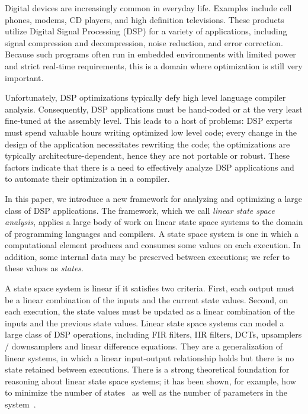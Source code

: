 

    Digital devices are increasingly common in everyday life. Examples
include cell phones, modems, CD players, and high definition
televisions. These products utilize Digital Signal Processing (DSP)
for a variety of applications, including signal compression and
decompression, noise reduction, and error correction.  Because such
programs often run in embedded environments with limited power and
strict real-time requirements, this is a domain where optimization is
still very important.  

Unfortunately, DSP optimizations typically defy high level language
compiler analysis.  Consequently, DSP applications must be hand-coded
or at the very least fine-tuned at the assembly level. This leads to a
host of problems: DSP experts must spend valuable hours writing
optimized low level code; every change in the design of the
application necessitates rewriting the code; the optimizations are
typically architecture-dependent, hence they are not portable or
robust.  These factors indicate that there is a need to effectively
analyze DSP applications and to automate their optimization in a
compiler.

In this paper, we introduce a new framework for analyzing and
optimizing a large class of DSP applications.  The framework, which we
call {\it linear state space analysis}, applies a large body of work
on linear state space systems to the domain of programming languages
and compilers.  A state space system is one in which a computational
element produces and consumes some values on each execution.  In
addition, some internal data may be preserved between executions; we
refer to these values as {\it states}.

A state space system is linear if it satisfies two criteria.  First,
each output must be a linear combination of the inputs and the current
state values.  Second, on each execution, the state values must be
updated as a linear combination of the inputs and the previous state
values.  Linear state space systems can model a large class of DSP
operations, including FIR filters, IIR filters, DCTs, upsamplers /
downsamplers and linear difference equations.  They are a
generalization of linear systems, in which a linear input-output
relationship holds but there is no state retained between executions.
There is a strong theoretical foundation for reasoning about linear
state space systems; it has been shown, for example, how to minimize
the number of states~\cite{Moore} as well as the number of parameters
in the system~\cite{Mayne,Schutter,Ackermann/Bucy}.


